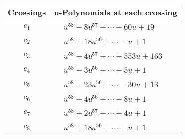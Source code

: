 \documentclass[1p]{elsarticle_modified}
\theoremstyle{definition}
\begin{document}
\begin{tabular}{m{50pt}|m{274pt}}
Crossings & \hspace{64pt}u-Polynomials at each crossing \\
\hline $$\begin{aligned}c_{1}\end{aligned}$$&$\begin{aligned}
&u^{58}-8 u^{57}+\cdots+60 u+19
\end{aligned}$\\
\hline $$\begin{aligned}c_{2}\end{aligned}$$&$\begin{aligned}
&u^{58}+18 u^{56}+\cdots- u+1
\end{aligned}$\\
\hline $$\begin{aligned}c_{3}\end{aligned}$$&$\begin{aligned}
&u^{58}-4 u^{57}+\cdots+553 u+163
\end{aligned}$\\
\hline $$\begin{aligned}c_{4}\end{aligned}$$&$\begin{aligned}
&u^{58}-3 u^{56}+\cdots+5 u+1
\end{aligned}$\\
\hline $$\begin{aligned}c_{5}\end{aligned}$$&$\begin{aligned}
&u^{58}+23 u^{56}+\cdots-30 u+13
\end{aligned}$\\
\hline $$\begin{aligned}c_{6}\end{aligned}$$&$\begin{aligned}
&u^{58}+4 u^{56}+\cdots-8 u+1
\end{aligned}$\\
\hline $$\begin{aligned}c_{7}\end{aligned}$$&$\begin{aligned}
&u^{58}+2 u^{57}+\cdots+4 u+1
\end{aligned}$\\
\hline $$\begin{aligned}c_{8}\end{aligned}$$&$\begin{aligned}
&u^{58}+18 u^{56}+\cdots+u+1
\end{aligned}$\\

\end{tabular}
\end{document}
